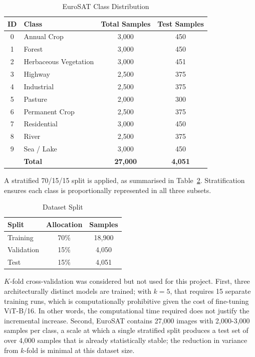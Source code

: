 \documentclass[12pt, letterpaper]{article}
\begin{document}
\begin{table}[h!]
    \centering
    \caption{EuroSAT Class Distribution}
    \label{tab:classes}
    \begin{tabular}{@{}clcc@{}}
        \toprule
        \textbf{ID} & \textbf{Class} &
        \textbf{Total Samples} & \textbf{Test Samples} \\
        \midrule
        0 & Annual Crop           & 3,000 & 450 \\
        1 & Forest                & 3,000 & 450 \\
        2 & Herbaceous Vegetation & 3,000 & 451 \\
        3 & Highway               & 2,500 & 375 \\
        4 & Industrial            & 2,500 & 375 \\
        5 & Pasture               & 2,000 & 300 \\
        6 & Permanent Crop        & 2,500 & 375 \\
        7 & Residential           & 3,000 & 450 \\
        8 & River                 & 2,500 & 375 \\
        9 & Sea / Lake            & 3,000 & 450 \\
        \midrule
          & \textbf{Total}        & \textbf{27,000} & \textbf{4,051} \\
        \bottomrule
    \end{tabular}
\end{table}

A stratified 70/15/15 split is applied, as summarised in Table~\ref{tab:split}.
Stratification ensures each class is proportionally represented in all three subsets.

\begin{table}[h!]
    \centering
    \caption{Dataset Split}
    \label{tab:split}
    \begin{tabular}{@{}lcc@{}}
        \toprule
        \textbf{Split} & \textbf{Allocation} & \textbf{Samples} \\
        \midrule
        Training   & 70\% & 18,900 \\
        Validation & 15\% & 4,050  \\
        Test       & 15\% & 4,051  \\
        \bottomrule
    \end{tabular}
\end{table}

$K$-fold cross-validation was considered but not used for this project. First, three architecturally distinct models are trained; with $k = 5$, that requires 15 separate training runs, which is computationally prohibitive given the cost of fine-tuning ViT-B/16. In other words, the computational time required does not justify the incremental increase.
Second, EuroSAT contains 27,000 images with 2,000-3,000 samples per class,
a scale at which a single stratified split produces a test set of over 4,000 samples that is already statistically stable; the reduction in variance from $k$-fold is minimal at this dataset size.
\end{document}
